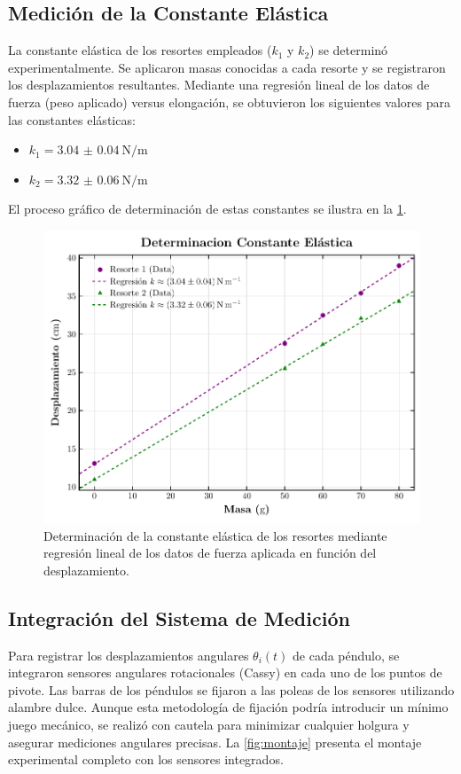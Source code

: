 \subsection*{Medici\'on de la Constante El\'astica}

La constante el\'astica de los resortes empleados ($k_1$ y $k_2$) se
determin\'o experimentalmente. Se aplicaron masas conocidas a cada
resorte y se registraron los desplazamientos resultantes.
Mediante una regresi\'on lineal de los datos de fuerza
(peso aplicado) versus elongaci\'on, se obtuvieron los siguientes
valores para las constantes el\'asticas:
\begin{itemize}
  \item $k_1 = \qty{3.04(4)}{\N\per\m}$
  \item $k_2 = \qty{3.32(6)}{\N\per\m}$
\end{itemize}
El proceso gr\'afico de determinaci\'on de estas constantes se
ilustra en la \cref{fig:regresion}.

\begin{figure}[htbp!]
  \centering
  \includegraphics[width=0.75\linewidth]{Figures/springs-plot.pdf}
  \caption{Determinaci\'on de la constante el\'astica de los resortes
    mediante regresi\'on lineal de los datos de fuerza aplicada en
  funci\'on del desplazamiento.}
  \label{fig:regresion}
\end{figure}

\subsection*{Integraci\'on del Sistema de Medici\'on}

Para registrar los desplazamientos angulares $\theta_i(t)$ de
cada p\'endulo, se integraron sensores angulares rotacionales
(Cassy) en cada uno de los puntos de pivote. Las barras de los
p\'endulos se fijaron a las poleas de los sensores utilizando
alambre dulce. Aunque esta metodolog\'ia de fijaci\'on podr\'ia
introducir un m\'inimo juego mec\'anico, se realiz\'o con cautela
para minimizar cualquier holgura y asegurar mediciones angulares
precisas. La \cref{fig:montaje} presenta el montaje experimental
completo con los sensores integrados.


